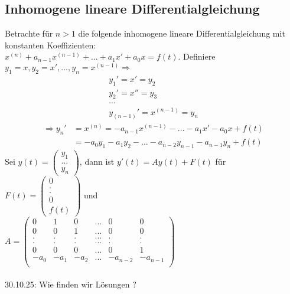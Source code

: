 \documentclass[12pt,a4paper]{article}
\newcommand{\DGL}{Differentialgleichung }
\newcommand{\LSG}{Lösungen }
\begin{document}
\subsection{Inhomogene lineare \DGL}
Betrachte für $n>1$ die folgende inhomogene lineare \DGL mit konstanten Koeffizienten:\\
$x^{(n)} + a_{n-1}x^{(n-1)} + ... + a_1x' + a_0x = f(t)$. Definiere $y_1=x, y_2=x', ..., y_n = x^(n-1) \Rightarrow$
\begin{align*}
y_1'=x'=y_2 \\
y_2'=x''=y_3 \\
... \\
y_{(n-1)}'=x^{(n-1)} = y_n
\end{align*}
\begin{align*}
\Rightarrow y_n' &= x^{(n)} = -a_{n-1}x^{(n-1)} - ... - a_1x'-a_0x+f(t) \\
&= -a_0y_1-a_1y_2-...-a_{n-2}y_{n-1}-a_{n-1}y_n+f(t)
\end{align*}
Sei $y(t) = \begin{pmatrix}
y_1 \\
... \\
y_n
\end{pmatrix}$, dann ist $y'(t) = Ay(t) + F(t)$ für $F(t) = \begin{pmatrix}
0 \\
. \\
. \\
0 \\
f(t)
\end{pmatrix}$ und \\ $A=\begin{pmatrix}
0 & 1 & 0 & ... & 0 & 0 \\
0 & 0 & 1 & ... & 0 & 0 \\
. & . & . & ... & . & . \\
. & . & . & ... & . & . \\
0 & 0 & 0 & ... & 0 & 1 \\
-a_0 & -a_1 & -a_2 & ... & -a_{n-2} & -a_{n-1} \\
\end{pmatrix}$ \\ \\
30.10.25:
Wie finden wir \LSG?
\end{document}

